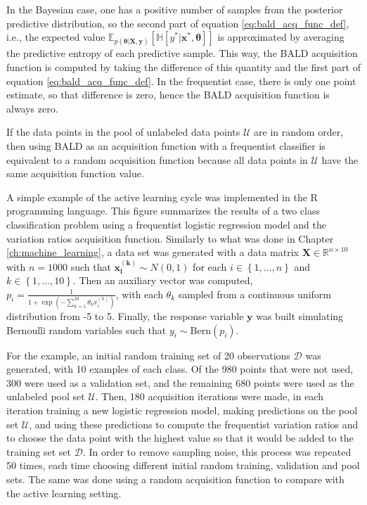 In the Bayesian case, one has a positive number of samples from the posterior predictive distribution, so the second part of equation \eqref{eq:bald_acq_func_def}, i.e., the expected value
$\mathbb{E}_{p(\boldsymbol{\theta} | \boldsymbol{X}, \boldsymbol{y})} \left[ \mathbb{H} \left[ y^* | \boldsymbol{x}^*, \boldsymbol{\theta} \right] \right]$
is approximated by averaging the predictive entropy of each predictive sample. This way, the BALD acquisition function is computed by taking the difference of this quantity and the first part of equation \eqref{eq:bald_acq_func_def}.
In the frequentist case, there is only one point estimate, so that difference is zero, hence the BALD acquisition function is always zero.

If the data points in the pool of unlabeled data points $\mathcal{U}$ are in random order, then using BALD as an acquisition function with a frequentist classifier is equivalent to a random acquisition function because all data points in $\mathcal{U}$ have the same acquisition function value.

A simple example of the active learning cycle was implemented in the R programming language. This figure summarizes the results of a two class classification problem using a frequentist logistic regression model and the variation ratios acquisition function. Similarly to what was done in Chapter \ref{ch:machine_learning}, a data set was generated with a data matrix $\boldsymbol{X} \in \mathbb{R}^{n \times 10}$ with $n = 1000$ such that $\boldsymbol{x_i^{(k)}} \sim N(0, 1)$ for each $i \in \left\{1, ..., n \right\}$ and $k \in \left\{1, ..., 10 \right\}$.
Then an auxiliary vector was computed, $p_i = \frac{1}{1 + \exp \left( - \sum_{k = 1}^{10} \theta_k x_i^{(k)}  \right)}$, with each $\theta_k$ sampled from a continuous uniform distribution from -5 to 5. Finally, the response variable $\boldsymbol{y}$ was built simulating Bernoulli random variables such that $y_i \sim \mathrm{Bern}(p_i)$.

For the example, an initial random training set of 20 observations $\mathcal{D}$ was generated, with 10 examples of each class. Of the 980 points that were not used, 300 were used as a validation set, and the remaining 680 points were used as the unlabeled pool set $\mathcal{U}$.
Then, 180 acquisition iterations were made, in each iteration training a new logistic regression model, making predictions on the pool set $\mathcal{U}$, and using these predictions to compute the frequentist variation ratios and to choose the data point with the highest value so that it would be added to the training set set $\mathcal{D}$. In order to remove sampling noise, this process was repeated 50 times, each time choosing different initial random training, validation and pool sets. The same was done using a random acquisition function to compare with the active learning setting.

